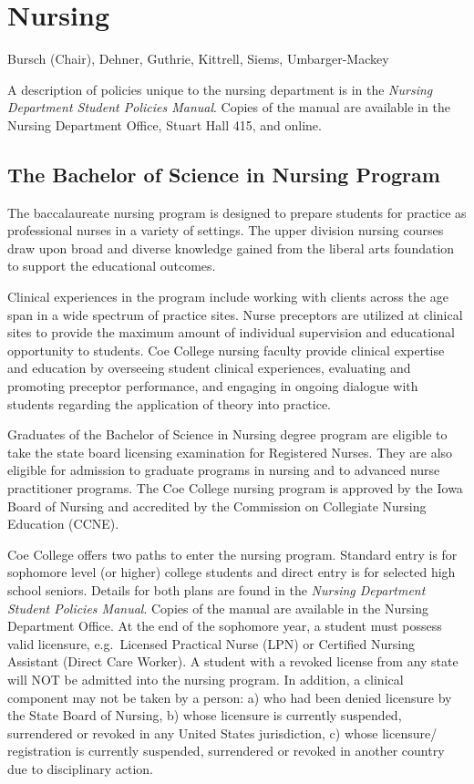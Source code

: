 \documentclass[
  letterpaper,
]{scrbook}
\begin{document}
\section{Nursing}\label{nursing}

Bursch (Chair), Dehner, Guthrie, Kittrell, Siems, Umbarger-Mackey

A description of policies unique to the nursing department is in the
\emph{Nursing Department Student Policies Manual}. Copies of the manual
are available in the Nursing Department Office, Stuart Hall 415, and
online.

\subsection{The Bachelor of Science in Nursing
Program}\label{the-bachelor-of-science-in-nursing-program}

The baccalaureate nursing program is designed to prepare students for
practice as professional nurses in a variety of settings. The upper
division nursing courses draw upon broad and diverse knowledge gained
from the liberal arts foundation to support the educational outcomes.

Clinical experiences in the program include working with clients across
the age span in a wide spectrum of practice sites. Nurse preceptors are
utilized at clinical sites to provide the maximum amount of individual
supervision and educational opportunity to students. Coe College nursing
faculty provide clinical expertise and education by overseeing student
clinical experiences, evaluating and promoting preceptor performance,
and engaging in ongoing dialogue with students regarding the application
of theory into practice.

Graduates of the Bachelor of Science in Nursing degree program are
eligible to take the state board licensing examination for Registered
Nurses. They are also eligible for admission to graduate programs in
nursing and to advanced nurse practitioner programs. The Coe College
nursing program is approved by the Iowa Board of Nursing and accredited
by the Commission on Collegiate Nursing Education (CCNE).

Coe College offers two paths to enter the nursing program. Standard
entry is for sophomore level (or higher) college students and direct
entry is for selected high school seniors. Details for both plans are
found in the \emph{Nursing Department Student Policies Manual}. Copies
of the manual are available in the Nursing Department Office. At the end
of the sophomore year, a student must possess valid licensure,
e.g.~Licensed Practical Nurse (LPN) or Certified Nursing Assistant
(Direct Care Worker). A student with a revoked license from any state
will NOT be admitted into the nursing program. In addition, a clinical
component may not be taken by a person: a) who had been denied licensure
by the State Board of Nursing, b) whose licensure is currently
suspended, surrendered or revoked in any United States jurisdiction, c)
whose licensure/ registration is currently suspended, surrendered or
revoked in another country due to disciplinary action.
\end{document}

